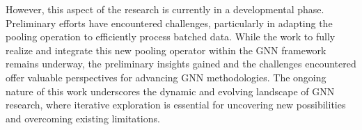 However, this aspect of the research is currently in a developmental phase. Preliminary efforts have encountered challenges, particularly in adapting the pooling operation to efficiently process batched data. While the work to fully realize and integrate this new pooling operator within the GNN framework remains underway, the preliminary insights gained and the challenges encountered offer valuable perspectives for advancing GNN methodologies. The ongoing nature of this work underscores the dynamic and evolving landscape of GNN research, where iterative exploration is essential for uncovering new possibilities and overcoming existing limitations.

